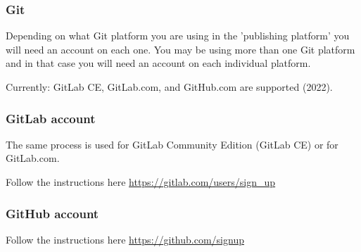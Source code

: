 \documentclass{article}
\begin{document}
\subsubsection{Git}\label{H4652413}



Depending on what Git platform you are using in the 'publishing platform' you will need an account on each one. You may be using more than one Git platform and in that case you will need an account on each individual platform.


Currently: GitLab CE, GitLab.com, and GitHub.com are supported (2022).


\subsubsection{GitLab account}\label{H3758785}



The same process is used for GitLab Community Edition (GitLab CE) or for GitLab.com.


Follow the instructions here \href{https://gitlab.com/users/sign_up}{https://gitlab.com/users/sign\_up} 


\subsubsection{GitHub account}\label{H2690045}



Follow the instructions here \href{https://github.com/signup}{https://github.com/signup}
\end{document}
